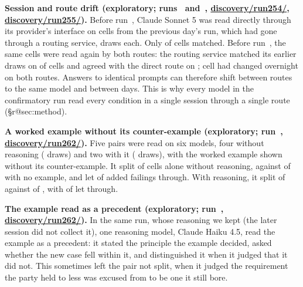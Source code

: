 \documentclass[11pt]{article}
\makeatletter
\newcommand{\model}[1]{#1}
\DeclareRobustCommand\ref[1]{\ifcsname r@#1\endcsname\rjlocalref{#1}\else\rjlocalref*{X-#1}\fi}}
\makeatother
\begin{document}
\textbf{Session and route drift (exploratory; runs~\ExplRunOrgVariations{} and~\ExplRunScaleCeiling{},
\url{discovery/run254/}, \url{discovery/run255/}).} Before run~\ExplRunOrgVariations{}, \model{Claude Sonnet 5} was
read directly through its provider's interface on \ExplRouteCheckCells{} cells from the previous day's run, which had
gone through a routing service, \ExplDiscoveryDraws{} draws each. Only \ExplRouteCheckMatch{} of
\ExplRouteCheckCells{} cells matched. Before run~\ExplRunScaleCeiling{}, the same cells were read again by both routes:
the routing service matched its earlier draws on \ExplRouteTriangleMatchBanked{} of \ExplRouteCheckCells{} cells and
agreed with the direct route on \ExplRouteTriangleMatchDirect{}; \ExplRouteTriangleOvernight{} cell had changed overnight on both
routes. Answers to identical prompts can therefore shift between routes to the same model and between days. This is
why every model in the confirmatory run read every condition in a single session through a single route
(\S\ref{sec:method}).

\textbf{A worked example without its counter-example (exploratory; run~\ExplRunExampleOnly{},
\url{discovery/run262/}).} Five pairs were read on six models, four without reasoning (\ExplExampleOnlyDrawsOff{}
draws) and two with it (\ExplExampleOnlyDrawsReasoning{} draws), with the worked example shown without its
counter-example. It split \ExplExampleOnlySplitNoReasoningAllNum{} of \ExplExampleOnlySplitNoReasoningAllDen{} cells
alone without reasoning, against \ExplExampleOnlyBareSplitNoReasoningAllNum{} of
\ExplExampleOnlyBareSplitNoReasoningAllDen{} with no example, and let \ExplExampleOnlyLetThroughNoReasoningAllNum{} of
\ExplExampleOnlyLetThroughNoReasoningAllDen{} added failings through. With reasoning, it split
\ExplExampleOnlySplitReasoningAllNum{} of \ExplExampleOnlySplitReasoningAllDen{} against
\ExplExampleOnlyBareSplitReasoningAllNum{} of \ExplExampleOnlyBareSplitReasoningAllDen{}, with
\ExplExampleOnlyLetThroughReasoningAllNum{} of \ExplExampleOnlyLetThroughReasoningAllDen{} let through.

\textbf{The example read as a precedent (exploratory; run~\ExplRunExampleOnly{}, \url{discovery/run262/}).} In the
same run, whose reasoning we kept (the later session did not collect it), one reasoning model, \model{Claude Haiku
4.5}, read the example as a precedent: it stated the principle the example decided, asked whether the new case fell
within it, and distinguished it when it judged that it did not. This sometimes left the pair not split, when it judged
the requirement the party held to less was excused from to be one it still bore.

\fi
\end{document}

